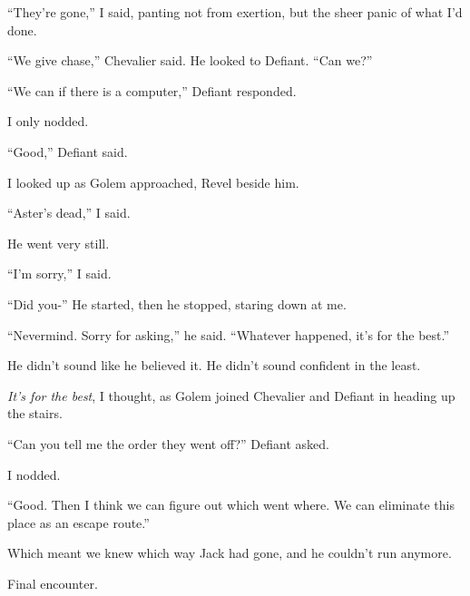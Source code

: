 ``They're gone,'' I said, panting not from exertion, but the sheer panic of what I'd done.



``We give chase,'' Chevalier said.  He looked to Defiant.  ``Can we?''



``We can if there is a computer,'' Defiant responded.



I only nodded.



``Good,'' Defiant said.



I looked up as Golem approached, Revel beside him.



``Aster's dead,'' I said.



He went very still.



``I'm sorry,'' I said.



``Did you-''  He started, then he stopped, staring down at me.



``Nevermind.  Sorry for asking,'' he said.  ``Whatever happened, it's for the best.''



He didn't sound like he believed it.  He didn't sound confident in the least.



\emph{It's for the best}, I thought, as Golem joined Chevalier and Defiant in heading up the stairs.



``Can you tell me the order they went off?''  Defiant asked.



I nodded.



``Good.  Then I think we can figure out which went where.  We can eliminate this place as an escape route.''



Which meant we knew which way Jack had gone, and he couldn't run anymore.



Final encounter.





